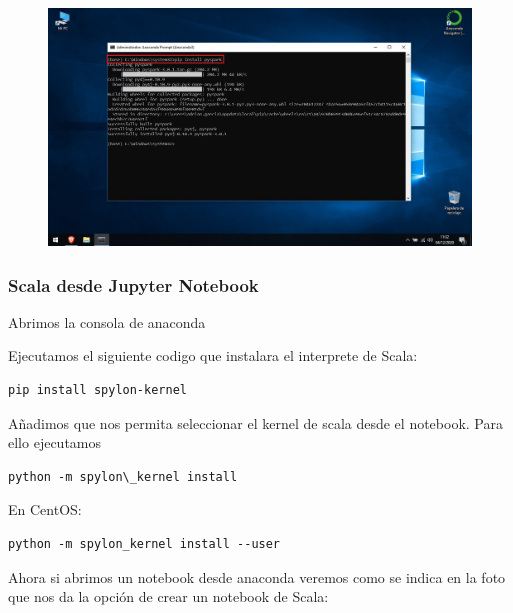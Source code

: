 \documentclass[a4paper,10pt]{article}
\begin{document}
\begin{figure}[H]
\begin{center}
\includegraphics[width=500pt]{./fotos/introduccion/20 - instalando pyspark anaconda (V).jpg}
\end{center}
\end{figure}

\subsubsection{Scala desde Jupyter Notebook}

Abrimos la consola de anaconda 

Ejecutamos el siguiente codigo que instalara el interprete de Scala:

\lstset{language=bash, breaklines=true, basicstyle=\ttfamily}
\begin{lstlisting}[frame=single]
pip install spylon-kernel 
\end{lstlisting}

Añadimos que nos permita seleccionar el kernel de scala desde el notebook. Para ello ejecutamos

\lstset{language=bash, breaklines=true, basicstyle=\ttfamily}
\begin{lstlisting}[frame=single]
python -m spylon\_kernel install
\end{lstlisting}


En CentOS:

\lstset{language=bash, breaklines=true, basicstyle=\ttfamily}
\begin{lstlisting}[frame=single]
python -m spylon_kernel install --user
\end{lstlisting}

Ahora si abrimos un notebook desde anaconda veremos como se indica en la foto que nos da la opción de crear un notebook de Scala: 
\end{document}
